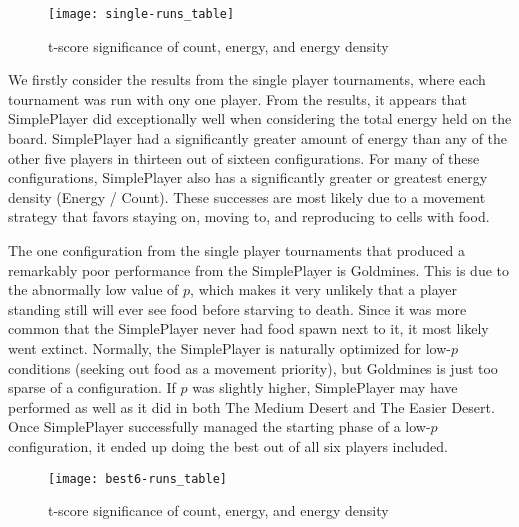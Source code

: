 \documentclass[
10pt, %
letterpaper, %
oneside, %
headinclude,footinclude, %
english
]{article}
\begin{document}
\begin{figure}[h]
\centering
\texttt{[image: single-runs\_table]}
\caption[Table of t-score statistics for Single Run Tournaments]{t-score significance of count, energy, and energy density}
\label{fig:gallery2}
\end{figure}

We firstly consider the results from the single player tournaments, where each tournament was run with ony one player. From the results, it appears that SimplePlayer did exceptionally well when considering the total energy held on the board. SimplePlayer had a significantly greater amount of energy than any of the other five players in thirteen out of sixteen configurations. For many of these configurations, SimplePlayer also has a significantly greater or greatest energy density (Energy / Count). These successes are most likely due to a movement strategy that favors staying on, moving to, and reproducing to cells with food.

The one configuration from the single player tournaments that produced a remarkably poor performance from the SimplePlayer is Goldmines. This is due to the abnormally low value of $p$, which makes it very unlikely that a player standing still will ever see food before starving to death. Since it was more common that the SimplePlayer never had food spawn next to it, it most likely went extinct. Normally, the SimplePlayer is naturally optimized for low-$p$ conditions (seeking out food as a movement priority), but Goldmines is just too sparse of a configuration. If $p$ was slightly higher, SimplePlayer may have performed as well as it did in both The Medium Desert and The Easier Desert. Once SimplePlayer successfully managed the starting phase of a low-$p$ configuration, it ended up doing the best out of all six players included.

\begin{figure}[h]
\centering
\texttt{[image: best6-runs\_table]}
\caption[Table of t-score statistics for Best Six Tournaments]{t-score significance of count, energy, and energy density}
\label{fig:gallery2}
\end{figure}
\end{document}
